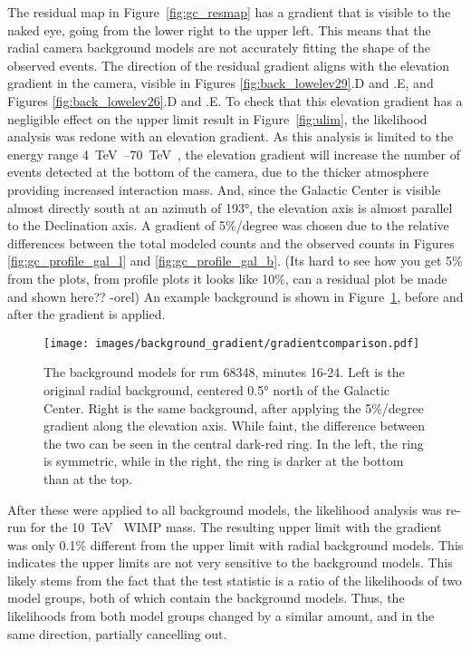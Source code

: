   The residual map in Figure~\ref{fig:gc_resmap} has a gradient that is visible to the naked eye, going from the lower right to the upper left.
  This means that the radial camera background models are not accurately fitting the shape of the observed events.
  The direction of the residual gradient aligns with the elevation gradient in the camera, visible in Figures \ref{fig:back_lowelev29}.D and .E, and Figures \ref{fig:back_lowelev26}.D and .E.
  To check that this elevation gradient has a negligible effect on the upper limit result in Figure~\ref{fig:ulim}, the likelihood analysis was redone with an elevation gradient.
  As this analysis is limited to the energy range \SIrange{4}{70}{\TeV{}}, the elevation gradient will increase the number of events detected at the bottom of the camera, due to the thicker atmosphere providing increased interaction mass.
  And, since the Galactic Center is visible almost directly south at an azimuth of \ang{193}, the elevation axis is almost parallel to the Declination axis.
  A gradient of 5\%/degree was chosen due to the relative differences between the total modeled counts and the observed counts in Figures \ref{fig:gc_profile_gal_l} and \ref{fig:gc_profile_gal_b}.
  {\color{red}(Its hard to see how you get 5\% from the plots, from profile plots it looks like 10\%, can a residual plot be made and shown here?? -orel)}
  An example background is shown in Figure~\ref{fig:bkg_flatvsgrad}, before and after the gradient is applied.
  
  \begin{figure}[ht]
    \centering
    \texttt{[image: images/background\_gradient/gradientcomparison.pdf]}
    \caption[Background Gradient Comparison]{
      The background models for run 68348, minutes 16-24.
      Left is the original radial background, centered \ang{0.5} north of the Galactic Center.
      Right is the same background, after applying the 5\%/degree gradient along the elevation axis.
      While faint, the difference between the two can be seen in the central dark-red ring.
      In the left, the ring is symmetric, while in the right, the ring is darker at the bottom than at the top.
    }
    \label{fig:bkg_flatvsgrad}
  \end{figure}
  
  After these were applied to all background models, the likelihood analysis was re-run for the \SI{10}{\TeV{}} WIMP mass.
  The resulting upper limit with the gradient was only 0.1\% different from the upper limit with radial background models.
  This indicates the upper limits are not very sensitive to the background models.
  This likely stems from the fact that the test statistic is a ratio of the likelihoods of two model groups, both of which contain the background models.
  Thus, the likelihoods from both model groups changed by a similar amount, and in the same direction, partially cancelling out.

